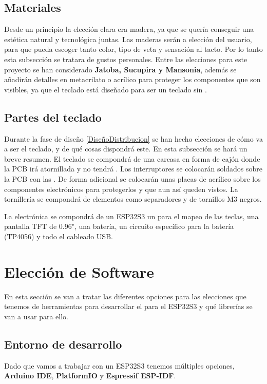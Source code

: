 \subsection{Materiales}
Desde un principio la elección clara era madera, ya que se quería conseguir una estética natural y tecnológica juntas. Las maderas serán a elección del usuario, para que pueda escoger tanto color, tipo de veta y sensación al tacto.
Por lo tanto esta subsección se tratara de gustos personales. Entre las elecciones para este proyecto se han considerado \textbf{Jatoba, Sucupira y Mansonia}, además se añadirán detalles en metacrilato o acrílico para proteger los componentes que son visibles, ya que el teclado está diseñado para ser un teclado sin .

\subsection{Partes del teclado}
Durante la fase de diseño \ref{DiseñoDistribucion} se han hecho elecciones de cómo va a ser el teclado, y de qué cosas dispondrá este. En esta subsección se hará un breve resumen. El teclado se compondrá de una carcasa en forma de cajón donde la \gls{PCB} irá atornillada y no tendrá . Los interruptores se colocarán soldados sobre la \gls{PCB} con las . De forma adicional se colocarán unas placas de acrílico sobre los componentes electrónicos para protegerlos y que aun así queden vistos. La tornillería se compondrá de elementos como separadores y de tornillos M3 negros.

La electrónica se compondrá de un ESP32S3 un  para el mapeo de las teclas, una pantalla \gls{TFT} de 0.96", una batería, un circuito específico para la batería (TP4056) y todo el cableado \gls{USB}.
\newpage

\section{Elección de Software}
En esta sección se van a tratar las diferentes opciones para las elecciones que tenemos de herramientas para desarrollar el  para el ESP32S3 y qué librerías se van a usar para ello.

\subsection{Entorno de desarrollo}
Dado que vamos a trabajar con un ESP32S3 tenemos múltiples opciones, \textbf{Arduino IDE}, \textbf{PlatformIO} y \textbf{Espressif ESP-IDF}.

